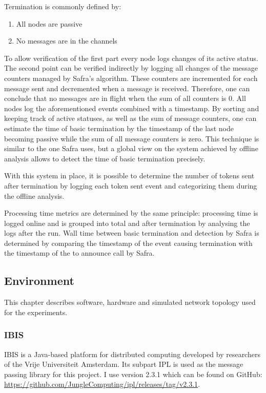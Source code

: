 Termination is commonly defined by:
\begin{enumerate}
    \item All nodes are passive
    \item No messages are in the channels
\end{enumerate}
To allow verification of the first part every node logs changes of its active status.
The second point can be verified indirectly by logging all changes of the message counters managed by Safra's algorithm.
These counters are incremented for each message sent and decremented when a message is received.
Therefore, one can conclude that no messages are in flight when the sum of all counters is 0.
All nodes log the aforementioned events combined with a timestamp.
By sorting and keeping track of active statuses, as well as the sum of message counters, one can estimate the time of basic termination by the timestamp of the last node becoming passive while the sum of all message counters is zero.
This technique is similar to the one Safra uses, but a global view on the system achieved by offline analysis allows to detect the time of basic termination precisely.

With this system in place, it is possible to determine the number of tokens sent after termination by logging each token sent event and categorizing them during the offline analysis.

Processing time metrics are determined by the same principle: processing time is logged online and is grouped into total and after termination by analysing the logs after the run.
Wall time between basic termination and detection by Safra is determined by comparing the timestamp of the event causing termination with the timestamp of the to announce call by Safra.

\subsection{Environment}
This chapter describes software, hardware and simulated network topology used for the experiments.
\subsubsection{IBIS}
IBIS is a Java-based platform for distributed computing developed by researchers of the Vrije Universiteit Amsterdam.
Its subpart IPL is used as the message passing library for this project.
I use version 2.3.1 which can be found on GitHub: \href{https://github.com/JungleComputing/ipl/releases/tag/v2.3.1}{https://github.com/JungleComputing/ipl/releases/tag/v2.3.1}.

